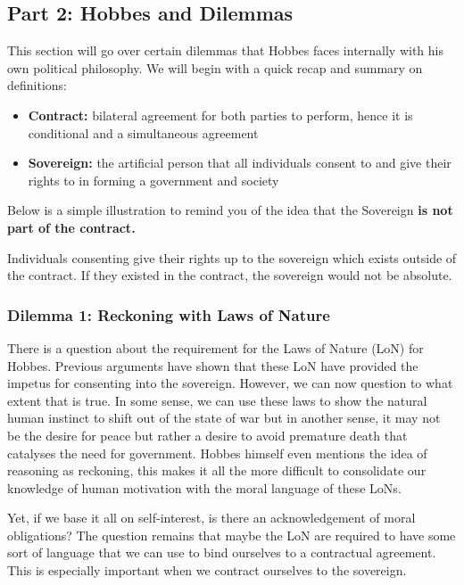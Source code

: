 \documentclass[12pt, letterpaper]{article}
\begin{document}
\subsection{Part 2: Hobbes and Dilemmas}
This section will go over certain dilemmas that Hobbes faces internally with his own political philosophy. We will begin with a quick recap and summary on definitions:
\begin{itemize}
	\item \textbf{Contract:} bilateral agreement for both parties to perform, hence it is conditional and a simultaneous agreement
	\item \textbf{Sovereign:} the artificial person that all individuals consent to and give their rights to in forming a government and society
\end{itemize}
Below is a simple illustration to remind you of the idea that the Sovereign \textbf{is not part of the contract.}
\begin{center}

	Individuals consenting give their rights up to the sovereign which exists outside of the contract. If they existed in the contract, the sovereign would not be absolute.
\end{center}

\subsubsection{Dilemma 1: Reckoning with Laws of Nature}
There is a question about the requirement for the Laws of Nature (LoN) for Hobbes. Previous arguments have shown that these LoN have provided the impetus for consenting into the sovereign. However, we can now question to what extent that is true. In some sense, we can use these laws to show the natural human instinct to shift out of the state of war but in another sense, it may not be the desire for peace but rather a desire to avoid premature death that catalyses the need for government. Hobbes himself even mentions the idea of reasoning as reckoning, this makes it all the more difficult to consolidate our knowledge of human motivation with the moral language of these LoNs.

Yet, if we base it all on self-interest, is there an acknowledgement of moral obligations? The question remains that maybe the LoN are required to have some sort of language that we can use to bind ourselves to a contractual agreement. This is especially important when we contract ourselves to the sovereign.
\end{document}
